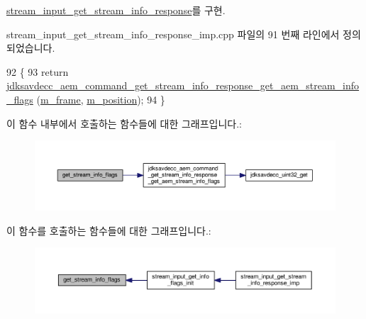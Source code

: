 \hyperlink{classavdecc__lib_1_1stream__input__get__stream__info__response_a24ae25b3a229f07ea76104024141ca84}{stream\+\_\+input\+\_\+get\+\_\+stream\+\_\+info\+\_\+response}를 구현.



stream\+\_\+input\+\_\+get\+\_\+stream\+\_\+info\+\_\+response\+\_\+imp.\+cpp 파일의 91 번째 라인에서 정의되었습니다.


\begin{DoxyCode}
92 \{
93     \textcolor{keywordflow}{return} 
      \hyperlink{group__command__get__stream__info__response_gaf959298de474d121f4c6b2e89e6c1a34}{jdksavdecc\_aem\_command\_get\_stream\_info\_response\_get\_aem\_stream\_info\_flags}
      (\hyperlink{classavdecc__lib_1_1stream__input__get__stream__info__response__imp_a50417969cf438e7c8d698726bbbe2ff9}{m\_frame}, \hyperlink{classavdecc__lib_1_1stream__input__get__stream__info__response__imp_af5e691c4a8a0feb07f48440b321206cd}{m\_position});
94 \}
\end{DoxyCode}


이 함수 내부에서 호출하는 함수들에 대한 그래프입니다.\+:
\nopagebreak
\begin{figure}[H]
\begin{center}
\leavevmode
\includegraphics[width=350pt]{classavdecc__lib_1_1stream__input__get__stream__info__response__imp_a7694ef99f2af4fac732fa2a5128a862d_cgraph}
\end{center}
\end{figure}




이 함수를 호출하는 함수들에 대한 그래프입니다.\+:
\nopagebreak
\begin{figure}[H]
\begin{center}
\leavevmode
\includegraphics[width=350pt]{classavdecc__lib_1_1stream__input__get__stream__info__response__imp_a7694ef99f2af4fac732fa2a5128a862d_icgraph}
\end{center}
\end{figure}



